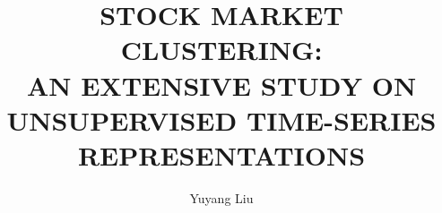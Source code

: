 \documentclass[12pt]{report}
\begin{document}
\title{STOCK MARKET CLUSTERING: \\ AN EXTENSIVE STUDY ON UNSUPERVISED TIME-SERIES REPRESENTATIONS}

\author{Yuyang Liu}

\normallinespacing
\maketitle

\contents

\preface





\body







\end{document}
